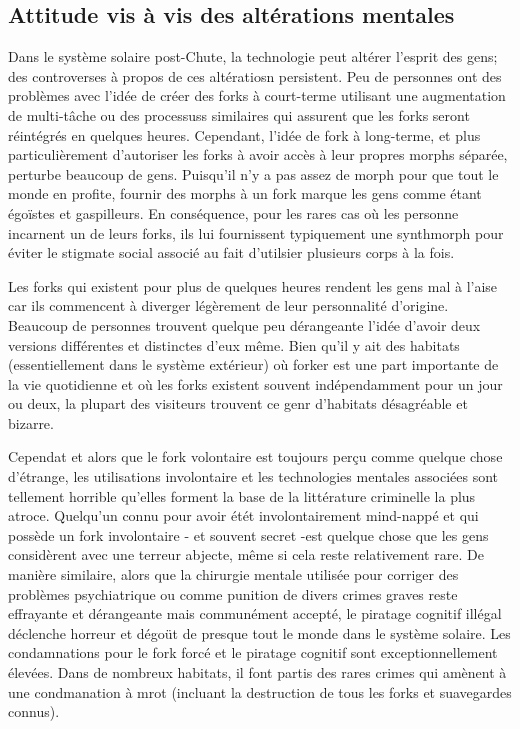             \subsection{Attitude vis à vis des altérations mentales} \label{sec:attit-towards-ment} 

            Dans le système solaire post-Chute, la technologie peut altérer l'esprit des gens; des controverses à propos de ces altératiosn persistent. Peu de personnes ont des problèmes avec l'idée de créer des forks à court-terme utilisant une augmentation de multi-tâche ou des processuss similaires qui assurent que les forks seront réintégrés en quelques heures. Cependant, l'idée de fork à long-terme, et plus particulièrement d'autoriser les forks à avoir accès à leur propres morphs séparée, perturbe beaucoup de gens. Puisqu'il n'y a pas assez de morph pour que tout le monde en profite, fournir des morphs à un fork marque les gens comme étant égoïstes et gaspilleurs. En conséquence, pour les rares cas où les personne incarnent un de leurs forks, ils lui fournissent typiquement une synthmorph pour éviter le stigmate social associé au fait d'utilsier plusieurs corps à la fois. 

            Les forks qui existent pour plus de quelques heures rendent les gens mal à l'aise car ils commencent à diverger légèrement de leur personnalité d'origine. Beaucoup de personnes trouvent quelque peu dérangeante l'idée d'avoir deux versions différentes et distinctes d'eux même. Bien qu'il y ait des habitats (essentiellement dans le système extérieur) où forker est une part importante de la vie quotidienne et où les forks existent souvent indépendamment pour un jour ou deux, la plupart des visiteurs trouvent ce genr d'habitats désagréable et bizarre. 

            Cependat et alors que le fork volontaire est toujours perçu comme quelque chose d'étrange, les utilisations involontaire et les technologies mentales associées sont tellement horrible qu'elles forment la base de la littérature criminelle la plus atroce. Quelqu'un connu pour avoir étét involontairement mind-nappé et qui possède un fork involontaire - et souvent secret -est quelque chose que les gens considèrent avec une terreur abjecte, même si cela reste relativement rare. De manière similaire, alors que la chirurgie mentale utilisée pour corriger des problèmes psychiatrique ou comme punition de divers crimes graves reste effrayante et dérangeante mais communément accepté, le piratage cognitif illégal déclenche horreur et dégoüt de presque tout le monde dans le système solaire. Les condamnations pour le fork forcé et le piratage cognitif sont exceptionnellement élevées. Dans de nombreux habitats, il font partis des rares crimes qui amènent à une condmanation à mrot (incluant la destruction de tous les forks et suavegardes connus). 

